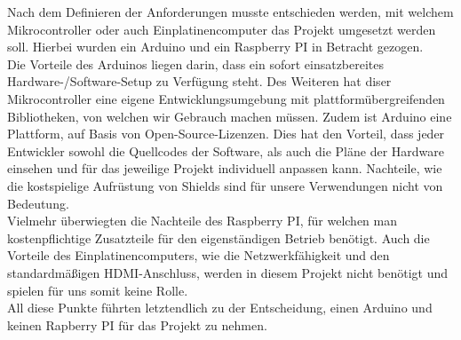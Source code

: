 \label{arduinovsRasbPI}

Nach dem Definieren der Anforderungen musste entschieden werden, mit welchem Mikrocontroller oder auch Einplatinencomputer das Projekt umgesetzt werden soll. Hierbei wurden ein Arduino und ein Raspberry PI in Betracht gezogen. \\
Die Vorteile des Arduinos liegen darin, dass ein sofort einsatzbereites Hardware-/Software-Setup zu Verfügung steht. Des Weiteren hat diser Mikrocontroller eine eigene Entwicklungsumgebung mit plattformübergreifenden Bibliotheken, von welchen wir Gebrauch machen müssen. Zudem ist Arduino eine Plattform, auf Basis von Open-Source-Lizenzen. Dies hat den Vorteil, dass jeder Entwickler sowohl die Quellcodes der Software, als auch die Pläne der Hardware einsehen und für das jeweilige Projekt individuell anpassen kann. \cite[Vgl.]{MircoLang.2018} Nachteile, wie die kostspielige Aufrüstung von Shields sind für unsere Verwendungen nicht von Bedeutung. \\
Vielmehr überwiegten die Nachteile des Raspberry PI, für welchen man kostenpflichtige Zusatzteile für den eigenständigen Betrieb benötigt. Auch die Vorteile des Einplatinencomputers, wie die Netzwerkfähigkeit und den standardmäßigen \ac{HDMI}-Anschluss, werden in diesem Projekt nicht benötigt und spielen für uns somit keine Rolle. \cite[Vgl.]{IONOS.2018} \\
All diese Punkte führten letztendlich zu der Entscheidung, einen Arduino und keinen Rapberry PI für das Projekt zu nehmen. \\
